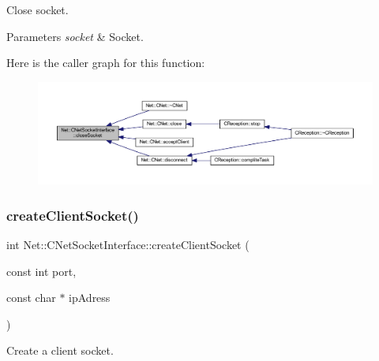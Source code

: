 Close socket. 


\begin{DoxyParams}{Parameters}
{\em socket} & Socket. \\
\hline
\end{DoxyParams}
Here is the caller graph for this function\+:
\nopagebreak
\begin{figure}[H]
\begin{center}
\leavevmode
\includegraphics[width=350pt]{class_net_1_1_c_net_socket_interface_a32974d8d814e78f05208eec685376df5_icgraph}
\end{center}
\end{figure}
\mbox{\label{class_net_1_1_c_net_socket_interface_a52ca61f347f9f08cf0ad85e45f081906}} 
\subsubsection{\texorpdfstring{create\+Client\+Socket()}{createClientSocket()}}
{\footnotesize\ttfamily int Net\+::\+C\+Net\+Socket\+Interface\+::create\+Client\+Socket (\begin{DoxyParamCaption}\item[{const int}]{port,  }\item[{const char $\ast$}]{ip\+Adress }\end{DoxyParamCaption})\hspace{0.3cm}{\ttfamily [static]}}



Create a client socket. 


